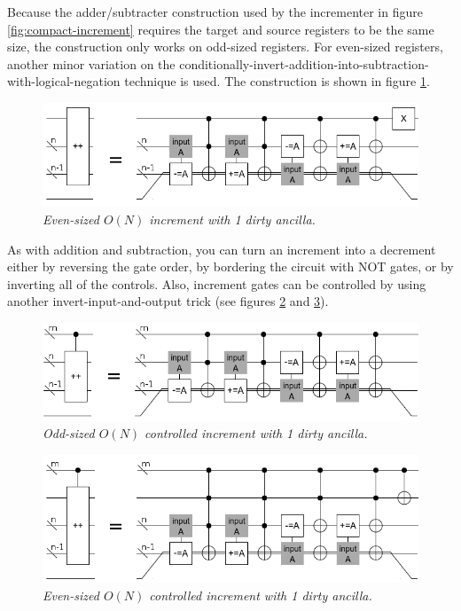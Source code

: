 \documentclass[twocolumn]{article}
\begin{document}
Because the adder/subtracter construction used by the incrementer in figure \ref{fig:compact-increment} requires the target and source registers to be the same size, the construction only works on odd-sized registers.
For even-sized registers, another minor variation on the conditionally-invert-addition-into-subtraction-with-logical-negation technique is used.
The construction is shown in figure \ref{fig:compact-increment-even}.

\begin{figure}
  \centering
  \includegraphics[totalheight=2cm]{compact-increment-even.png}
  \caption{\em Even-sized $O(N)$ increment with 1 dirty ancilla.}
  \label{fig:compact-increment-even}
\end{figure}

As with addition and subtraction, you can turn an increment into a decrement either by reversing the gate order, by bordering the circuit with NOT gates, or by inverting all of the controls.
Also, increment gates can be controlled by using another invert-input-and-output trick (see figures \ref{fig:controlled-increment-odd} and \ref{fig:controlled-increment-even}).

\begin{figure}
  \centering
  \includegraphics[totalheight=2cm]{controlled-increment-odd.png}
  \caption{\em Odd-sized $O(N)$ controlled increment with 1 dirty ancilla.}
  \label{fig:controlled-increment-odd}
\end{figure}

\begin{figure}
  \centering
  \includegraphics[totalheight=2.5cm]{controlled-increment-even.png}
  \caption{\em Even-sized $O(N)$ controlled increment with 1 dirty ancilla.}
  \label{fig:controlled-increment-even}
\end{figure}
\end{document}
